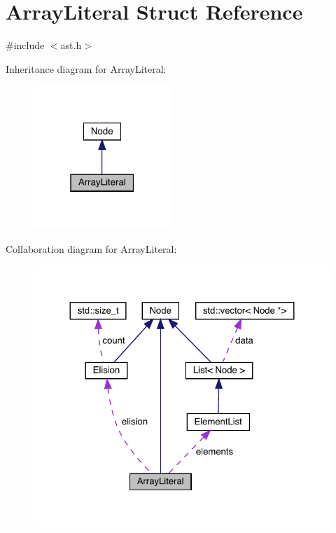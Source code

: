 \hypertarget{struct_array_literal}{}\section{Array\+Literal Struct Reference}
\label{struct_array_literal}


{\ttfamily \#include $<$ast.\+h$>$}



Inheritance diagram for Array\+Literal\+:\nopagebreak
\begin{figure}[H]
\begin{center}
\leavevmode
\includegraphics[width=147pt]{struct_array_literal__inherit__graph}
\end{center}
\end{figure}


Collaboration diagram for Array\+Literal\+:\nopagebreak
\begin{figure}[H]
\begin{center}
\leavevmode
\includegraphics[width=324pt]{struct_array_literal__coll__graph}
\end{center}
\end{figure}
